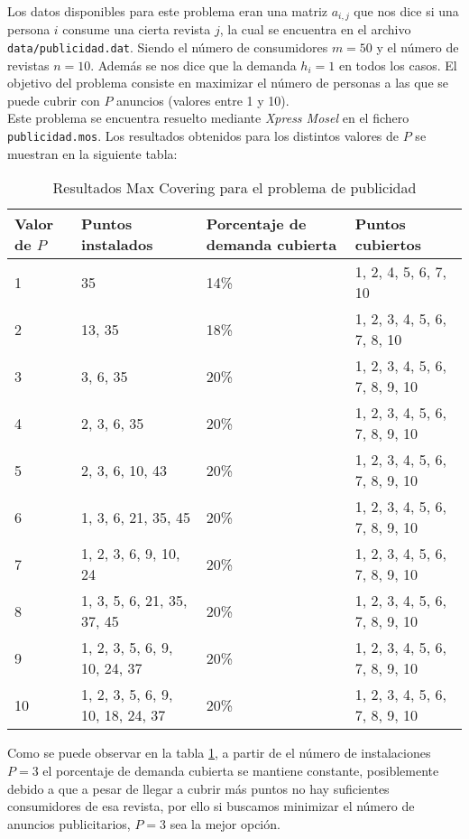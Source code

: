 \documentclass[a4paper,11pt]{article}
\begin{document}
Los datos disponibles para este problema eran una matriz ${a_{i,j}}$ que nos dice si una persona ${i}$ consume una cierta revista ${j}$, la cual se encuentra en el archivo \texttt{data/publicidad.dat}. Siendo el número de consumidores ${m=50}$ y el número de revistas ${n=10}$. Además se nos dice que la demanda ${h_i=1}$ en todos los casos. El objetivo del problema consiste en maximizar el número de personas a las que se puede cubrir con ${P}$ anuncios (valores entre 1 y 10).\\

Este problema se encuentra resuelto mediante \textit{Xpress Mosel} en el fichero \texttt{publicidad.mos}. Los resultados obtenidos para los distintos valores de ${P}$ se muestran en la siguiente tabla:\\

\begin{table}[!htbp]
\label{4_max_publicidad}
\centering
\begin{tabular}{|l|l|p{3cm}|l|}
\hline
Valor de ${P}$	& Puntos instalados  & Porcentaje de demanda cubierta	& Puntos cubiertos	\\ \hline
1	& 35								& 14\%	& 1, 2, 4, 5, 6, 7, 10			\\ \hline
2	& 13, 35							& 18\%	& 1, 2, 3, 4, 5, 6, 7, 8, 10	\\ \hline
3	& 3, 6, 35							& 20\%	& 1, 2, 3, 4, 5, 6, 7, 8, 9, 10	\\ \hline
4	& 2, 3, 6, 35						& 20\%	& 1, 2, 3, 4, 5, 6, 7, 8, 9, 10	\\ \hline
5	& 2, 3, 6, 10, 43					& 20\%	& 1, 2, 3, 4, 5, 6, 7, 8, 9, 10	\\ \hline
6	& 1, 3, 6, 21, 35, 45				& 20\%	& 1, 2, 3, 4, 5, 6, 7, 8, 9, 10	\\ \hline
7	& 1, 2, 3, 6, 9, 10, 24				& 20\%	& 1, 2, 3, 4, 5, 6, 7, 8, 9, 10	\\ \hline
8	& 1, 3, 5, 6, 21, 35, 37, 45		& 20\%	& 1, 2, 3, 4, 5, 6, 7, 8, 9, 10	\\ \hline
9	& 1, 2, 3, 5, 6, 9, 10, 24, 37		& 20\%	& 1, 2, 3, 4, 5, 6, 7, 8, 9, 10	\\ \hline
10	& 1, 2, 3, 5, 6, 9, 10, 18, 24, 37	& 20\%	& 1, 2, 3, 4, 5, 6, 7, 8, 9, 10	\\ \hline
\end{tabular}
\caption{Resultados Max Covering para el problema de publicidad}
\end{table}

Como se puede observar en la tabla \ref{4_max_publicidad}, a partir de el número de instalaciones ${P=3}$ el porcentaje de demanda cubierta se mantiene constante, posiblemente debido a que a pesar de llegar a cubrir más puntos no hay suficientes consumidores de esa revista, por ello si buscamos minimizar el número de anuncios publicitarios, ${P=3}$ sea la mejor opción.
\end{document}
